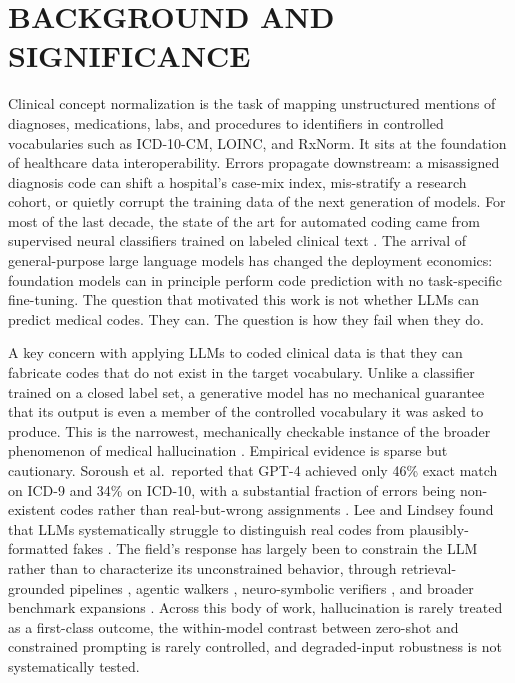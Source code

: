 \section{BACKGROUND AND SIGNIFICANCE}\label{background-and-significance}

Clinical concept normalization is the task of mapping unstructured
mentions of diagnoses, medications, labs, and procedures to
identifiers in controlled vocabularies such as ICD-10-CM, LOINC,
and RxNorm. It sits at the foundation of healthcare data
interoperability. Errors propagate downstream: a misassigned
diagnosis code can shift a hospital's case-mix index, mis-stratify
a research cohort, or quietly corrupt the training data of the
next generation of models. For most of the last decade, the state
of the art for automated coding came from supervised neural
classifiers trained on labeled clinical text \autocite{Mullenbach2018,Huang2022}. The arrival of general-purpose large language models
has changed the deployment economics: foundation models can in
principle perform code prediction with no task-specific
fine-tuning. The question that motivated this work is not whether
LLMs can predict medical codes. They can. The question is how
they fail when they do.

A key concern with applying LLMs to coded clinical data is that
they can fabricate codes that do not exist in the target
vocabulary. Unlike a classifier trained on a closed label set, a
generative model has no mechanical guarantee that its output is
even a member of the controlled vocabulary it was asked to
produce. This is the narrowest, mechanically checkable instance
of the broader phenomenon of medical hallucination \autocite{Kim2025,Ji2023}. Empirical evidence is sparse but cautionary. Soroush
et al.~reported that GPT-4 achieved only 46\% exact match on ICD-9
and 34\% on ICD-10, with a substantial fraction of errors being
non-existent codes rather than real-but-wrong assignments
\autocite{Soroush2024}. Lee and Lindsey found that LLMs systematically
struggle to distinguish real codes from plausibly-formatted fakes
\autocite{Lee2024}. The field's response has largely been to constrain
the LLM rather than to characterize its unconstrained behavior,
through retrieval-grounded pipelines \autocite{DasBaksi2024,Sarvari2025}, agentic walkers \autocite{Motzfeldt2025}, neuro-symbolic
verifiers \autocite{HybridCode2025}, and broader benchmark expansions
\autocite{Almeida2025,Singh2025,Li2025,Gershon2025}. Across this
body of work, hallucination is rarely treated as a first-class
outcome, the within-model contrast between zero-shot and
constrained prompting is rarely controlled, and degraded-input
robustness is not systematically tested.

